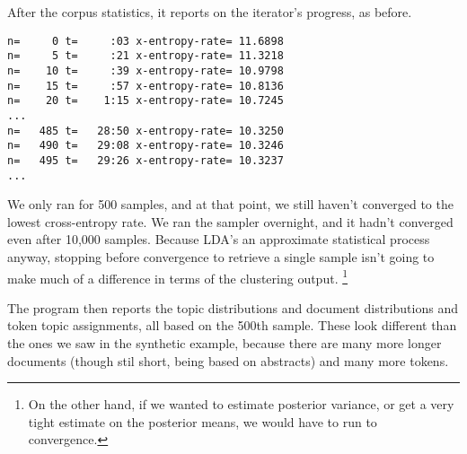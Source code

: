 After the corpus statistics, it reports on the iterator's progress, as
before.
%
\begin{verbatim}
n=     0 t=     :03 x-entropy-rate= 11.6898
n=     5 t=     :21 x-entropy-rate= 11.3218
n=    10 t=     :39 x-entropy-rate= 10.9798
n=    15 t=     :57 x-entropy-rate= 10.8136
n=    20 t=    1:15 x-entropy-rate= 10.7245
...
n=   485 t=   28:50 x-entropy-rate= 10.3250
n=   490 t=   29:08 x-entropy-rate= 10.3246
n=   495 t=   29:26 x-entropy-rate= 10.3237
...
\end{verbatim}
%
We only ran for 500 samples, and at that point, we still haven't
converged to the lowest cross-entropy rate.  We ran the sampler
overnight, and it hadn't converged even after 10,000 samples.  Because
LDA's an approximate statistical process anyway, stopping before
convergence to retrieve a single sample isn't going to make much
of a difference in terms of the clustering output.%
%
\footnote{On the other hand, if we wanted to estimate posterior variance, or
  get a very tight estimate on the posterior means, we would have to
  run to convergence.}

The program then reports the topic distributions and document
distributions and token topic assignments, all based on the 500th
sample.  These look different than the ones we saw in the synthetic
example, because there are many more longer documents (though stil
short, being based on abstracts) and many more tokens.  

